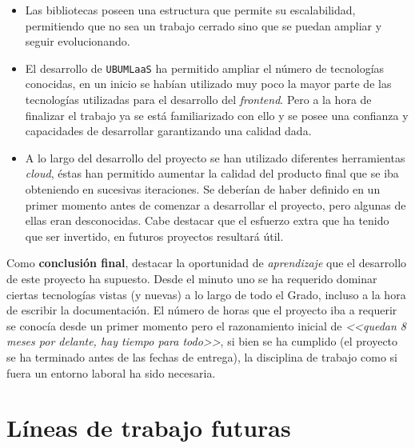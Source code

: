 \begin{itemize}
\item Las bibliotecas poseen una estructura que permite su escalabilidad, permitiendo que no sea un trabajo cerrado sino que se puedan ampliar y seguir evolucionando.
\item El desarrollo de \texttt{UBUMLaaS} ha permitido ampliar el número de tecnologías conocidas, en un inicio se habían utilizado muy poco la mayor parte de las tecnologías utilizadas para el desarrollo del \textit{frontend}. Pero a la hora de finalizar el trabajo ya se está familiarizado con ello y se posee una confianza y capacidades de desarrollar garantizando una calidad dada.
\item A lo largo del desarrollo del proyecto se han utilizado diferentes herramientas \emph{cloud}, éstas han permitido aumentar la calidad del producto final que se iba obteniendo en sucesivas iteraciones. Se deberían de haber definido en un primer momento antes de comenzar a desarrollar el proyecto, pero algunas de ellas eran desconocidas. Cabe destacar que el esfuerzo extra que ha tenido que ser invertido, en futuros proyectos resultará útil.
\end{itemize}

Como \textbf{conclusión final}, destacar la oportunidad de \emph{aprendizaje} que el desarrollo de este proyecto ha supuesto. Desde el minuto uno se ha requerido dominar ciertas tecnologías vistas (y nuevas) a lo largo de todo el Grado, incluso a la hora de escribir la documentación. El número de horas que el proyecto iba a requerir se conocía desde un primer momento pero el razonamiento inicial de \emph{<<quedan 8 meses por delante, hay tiempo para todo>>}, si bien se ha cumplido (el proyecto se ha terminado antes de las fechas de entrega), la disciplina de trabajo como si fuera un entorno laboral ha sido necesaria.

\section{Líneas de trabajo futuras}

